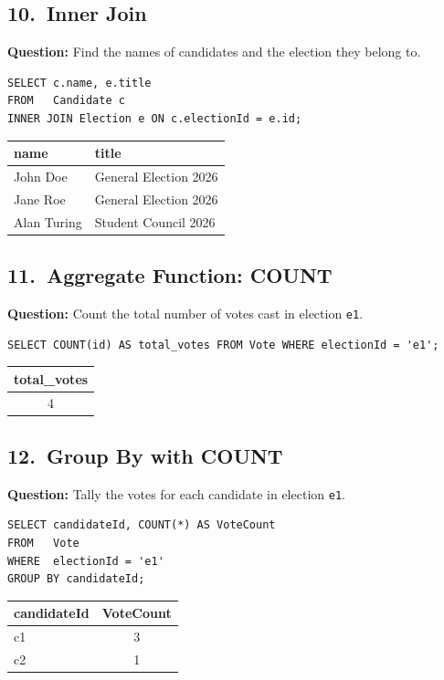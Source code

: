 \documentclass[12pt, a4paper]{article}
\begin{document}
\subsection{10.\ Inner Join}
\textbf{Question:} Find the names of candidates and the election they belong to.
\begin{lstlisting}
SELECT c.name, e.title
FROM   Candidate c
INNER JOIN Election e ON c.electionId = e.id;
\end{lstlisting}
\begin{center}
\begin{tabular}{|l|l|}
\hline
\textbf{name} & \textbf{title} \\ \hline
John Doe    & General Election 2026 \\
Jane Roe    & General Election 2026 \\
Alan Turing & Student Council 2026  \\ \hline
\end{tabular}
\end{center}

\subsection{11.\ Aggregate Function: COUNT}
\textbf{Question:} Count the total number of votes cast in election \texttt{e1}.
\begin{lstlisting}
SELECT COUNT(id) AS total_votes FROM Vote WHERE electionId = 'e1';
\end{lstlisting}
\begin{center}
\begin{tabular}{|c|}
\hline
\textbf{total\_votes} \\ \hline
4 \\ \hline
\end{tabular}
\end{center}

\subsection{12.\ Group By with COUNT}
\textbf{Question:} Tally the votes for each candidate in election \texttt{e1}.
\begin{lstlisting}
SELECT candidateId, COUNT(*) AS VoteCount
FROM   Vote
WHERE  electionId = 'e1'
GROUP BY candidateId;
\end{lstlisting}
\begin{center}
\begin{tabular}{|>{\ttfamily}l|c|}
\hline
\textbf{candidateId} & \textbf{VoteCount} \\ \hline
c1 & 3 \\
c2 & 1 \\ \hline
\end{tabular}
\end{center}
\end{document}
